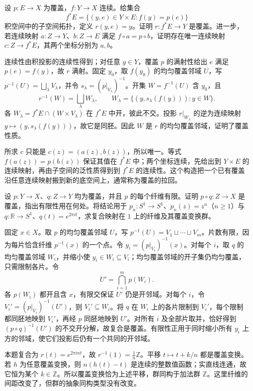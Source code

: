 \begin{exercise}\label{g1:ex:pullback-covering}
	设 \(p:E\to X\) 为覆盖，\(f:Y\to X\) 连续。给集合
	\[
		f^*E=\{(y,e)\in Y\times E:f(y)=p(e)\}
	\]
	积空间中的子空间拓扑，定义 \(r(y,e)=y\)。证明 \(r:f^*E\to Y\) 是覆盖。进一步，若连续映射 \(a:Z\to Y\)、\(b:Z\to E\) 满足 \(f\circ a=p\circ b\)，证明存在唯一连续映射 \(c:Z\to f^*E\)，其两个坐标分别为 \(a,b\)。
\end{exercise}
\begin{solution}
	连续性由积投影的连续性得到；对任意 \(y\in Y\)，覆盖 \(p\) 的满射性给出 \(e\) 满足 \(p(e)=f(y)\)，故 \(r\) 满射。固定 \(y_0\)，取 \(f(y_0)\) 的均匀覆盖邻域 \(U\)，写 \(p^{-1}(U)=\bigsqcup_\lambda V_\lambda\)，并令 \(s_\lambda=(p|_{V_\lambda})^{-1}\)。开集 \(W=f^{-1}(U)\) 含 \(y_0\)，且
	\[
		r^{-1}(W)=\bigsqcup_\lambda W_\lambda,\qquad
		W_\lambda=\{(y,s_\lambda(f(y))):y\in W\}.
	\]
	各 \(W_\lambda=f^*E\cap(W\times V_\lambda)\) 在 \(f^*E\) 中开，彼此不交。投影 \(r|_{W_\lambda}\) 的逆为连续映射 \(y\mapsto(y,s_\lambda(f(y)))\)，故它是同胚。因此 \(W\) 是 \(r\) 的均匀覆盖邻域，证明了覆盖性质。

	所求 \(c\) 只能是 \(c(z)=(a(z),b(z))\)，所以唯一。等式 \(f(a(z))=p(b(z))\) 保证其值在 \(f^*E\) 中；两个坐标连续，先给出到 \(Y\times E\) 的连续映射，再由子空间的泛性质得到到 \(f^*E\) 的连续性。这个构造把一个已有覆盖沿任意连续映射搬到新的底空间上，通常称为覆盖的拉回。
\end{solution}

\begin{exercise}\label{g1:ex:finite-cover-composition}
	设 \(p:Y\to X\)、\(q:Z\to Y\) 均为覆盖，并且 \(p\) 的每个纤维有限。证明 \(p\circ q:Z\to X\) 是覆盖，指出有限性用在何处。将结论用于 \(p_n:S^1\to S^1\)、\(p_n(z)=z^n\)（\(n\ge1\)）与 \(q:\mathbb R\to S^1\)、\(q(t)=e^{2\pi it}\)，求复合映射在 \(1\) 上的纤维及其覆盖变换群。
\end{exercise}
\begin{solution}
	固定 \(x\in X\)。取 \(p\) 的均匀覆盖邻域 \(U\)，写 \(p^{-1}(U)=V_1\sqcup\cdots\sqcup V_m\)。片数有限，因为每片恰含纤维 \(p^{-1}(x)\) 的一个点。令 \(y_i=(p|_{V_i})^{-1}(x)\)。对每个 \(i\)，取 \(q\) 的均匀覆盖邻域 \(W_i\)，并缩小使 \(y_i\in W_i\subseteq V_i\)；均匀覆盖邻域的开子集仍均匀覆盖，只需限制各片。令
	\[
		U'=\bigcap_{i=1}^m p(W_i).
	\]
	各 \(p(W_i)\) 都开且含 \(x\)，有限交保证 \(U'\) 仍是开邻域。对每个 \(i\)，令 \(V_i'=(p|_{V_i})^{-1}(U')\)，则 \(V_i'\subseteq W_i\)。将 \(q\) 在 \(W_i\) 上的各片限制到 \(V_i'\)，每个限制都同胚地映到 \(V_i'\)，再经 \(p\) 同胚地映到 \(U'\)。对所有 \(i\) 及全部片取并，恰好得到 \((p\circ q)^{-1}(U')\) 的不交开分解，故复合是覆盖。有限性正用于同时缩小所有 \(y_i\) 上方的邻域，使它们投影后仍有一个共同的开邻域。

	本题复合为 \(r(t)=e^{2\pi int}\)，故 \(r^{-1}(1)=\frac1n\mathbb Z\)。平移 \(t\mapsto t+k/n\) 都是覆盖变换。若 \(h\) 为任意覆盖变换，则 \(n(h(t)-t)\) 是连续的整数值函数；实直线连通，故它恒为某个 \(k\in\mathbb Z\)。所以覆盖变换恰为上述平移，群同构于加法群 \(\mathbb Z\)。这里纤维的间距改变了，但群的抽象同构类型没有改变。
\end{solution}

